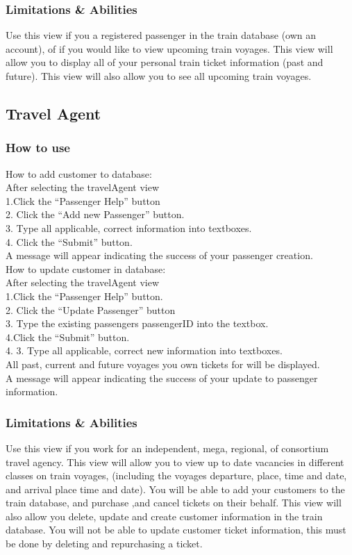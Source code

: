 \documentclass[letter]{article}
\begin{document}
\subsubsection{Limitations \& Abilities}
Use this view if you a registered passenger in the train database (own an account), of if you would like to view upcoming train voyages. This view will allow you to display all of your personal train ticket information (past and future).  This view will also allow you to see all upcoming train voyages.

\subsection{Travel Agent}
\subsubsection{How to use}
How to add customer to database:\\
After selecting the travelAgent view\\
1.Click the “Passenger Help” button\\
2. Click the “Add new Passenger” button. \\
3. Type all applicable, correct information into textboxes.\\
4. Click the “Submit” button.\\
A message will appear indicating the success of your passenger creation.\\

How to update customer in database:\\
After selecting the travelAgent view\\
1.Click the “Passenger Help” button.\\
2. Click the “Update Passenger” button\\
3. Type the existing passengers passengerID into the textbox.\\
4.Click the “Submit” button. \\
4. 3. Type all applicable, correct new information into textboxes.\\
All past, current and future voyages you own tickets for will be displayed. \\
A message will appear indicating the success of your update to passenger information.\\ 
\subsubsection{Limitations \& Abilities}
Use this view if you work for an independent, mega, regional, of consortium travel agency. This view will allow you to view up to date vacancies in different classes on train voyages, (including the voyages departure, place, time and date, and arrival place time and date).  You will be able to add your customers to the train database, and purchase ,and cancel tickets on their behalf. This view will also allow you delete, update and create customer information in the train database. You will not be able to update customer ticket information, this must be done by deleting and repurchasing a ticket. 
\end{document}
